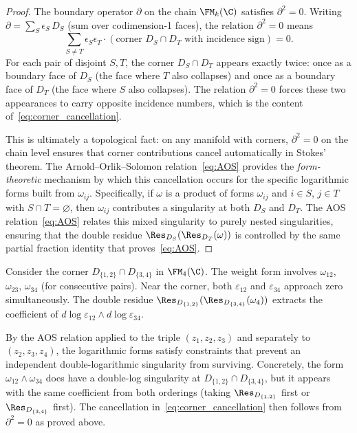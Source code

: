 \begin{proof}
The boundary operator $\partial$ on the chain $\FM_k(\C)$ satisfies $\partial^2 = 0$. Writing $\partial = \sum_S \epsilon_S\, D_S$ (sum over codimension-1 faces), the relation $\partial^2 = 0$ means
\[
\sum_{S \neq T} \epsilon_S \epsilon_T \cdot (\text{corner } D_S \cap D_T \text{ with incidence sign}) = 0.
\]
For each pair of disjoint $S, T$, the corner $D_S \cap D_T$ appears exactly twice: once as a boundary face of $D_S$ (the face where $T$ also collapses) and once as a boundary face of $D_T$ (the face where $S$ also collapses). The relation $\partial^2 = 0$ forces these two appearances to carry opposite incidence numbers, which is the content of~\eqref{eq:corner_cancellation}.

This is ultimately a topological fact: on any manifold with corners, $\partial^2 = 0$ on the chain level ensures that corner contributions cancel automatically in Stokes' theorem. The Arnold--Orlik--Solomon relation~\eqref{eq:AOS} provides the \emph{form-theoretic} mechanism by which this cancellation occurs for the specific logarithmic forms built from $\omega_{ij}$. Specifically, if $\omega$ is a product of forms $\omega_{ij}$ and $i \in S$, $j \in T$ with $S \cap T = \varnothing$, then $\omega_{ij}$ contributes a singularity at both $D_S$ and $D_T$. The AOS relation~\eqref{eq:AOS} relates this mixed singularity to purely nested singularities, ensuring that the double residue $\Res_{D_S}(\Res_{D_T}(\omega))$ is controlled by the same partial fraction identity that proves~\eqref{eq:AOS}.
\end{proof}

\begin{example}[Arnold cancellation for $k=4$, $S=\{1,2\}$, $T=\{3,4\}$]
\label{ex:arnold_k4}
Consider the corner $D_{\{1,2\}} \cap D_{\{3,4\}}$ in $\FM_4(\C)$. The weight form involves $\omega_{12}$, $\omega_{23}$, $\omega_{34}$ (for consecutive pairs). Near the corner, both $\varepsilon_{12}$ and $\varepsilon_{34}$ approach zero simultaneously. The double residue $\Res_{D_{\{1,2\}}}(\Res_{D_{\{3,4\}}}(\omega_4))$ extracts the coefficient of $d\log\varepsilon_{12} \wedge d\log\varepsilon_{34}$.

By the AOS relation applied to the triple $(z_1, z_2, z_3)$ and separately to $(z_2, z_3, z_4)$, the logarithmic forms satisfy constraints that prevent an independent double-logarithmic singularity from surviving. Concretely, the form $\omega_{12} \wedge \omega_{34}$ does have a double-log singularity at $D_{\{1,2\}} \cap D_{\{3,4\}}$, but it appears with the same coefficient from both orderings (taking $\Res_{D_{\{1,2\}}}$ first or $\Res_{D_{\{3,4\}}}$ first). The cancellation in~\eqref{eq:corner_cancellation} then follows from $\partial^2 = 0$ as proved above.
\end{example}


